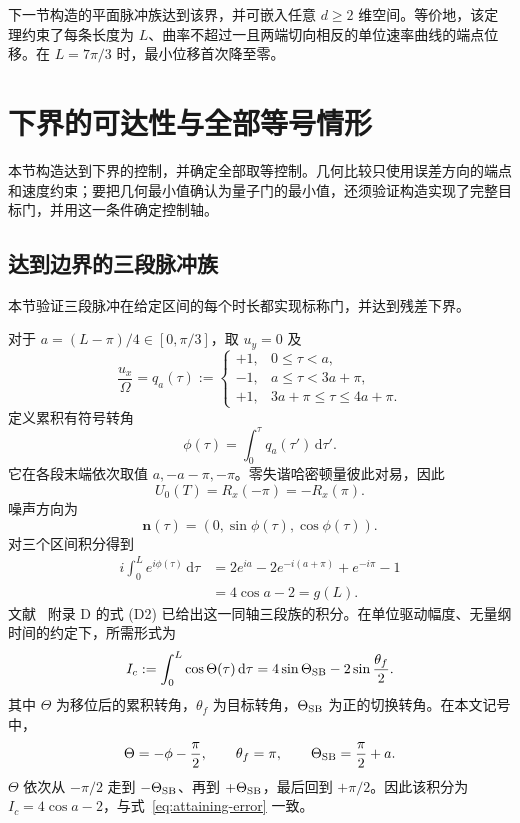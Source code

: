 \documentclass[12pt]{iopjournal}
\theoremstyle{definition}
\newcommand{\dd}{\mathrm{d}}
\newcommand{\nvec}{\mathbf n}
\begin{document}
下一节构造的平面脉冲族达到该界，并可嵌入任意 $d\ge2$ 维空间。等价地，该定理约束了每条长度为 $L$、曲率不超过一且两端切向相反的单位速率曲线的端点位移。在 $L=7\pi/3$ 时，最小位移首次降至零。

\section{下界的可达性与全部等号情形}
\label{sec:attainment}

本节构造达到下界的控制，并确定全部取等控制。几何比较只使用误差方向的端点和速度约束；要把几何最小值确认为量子门的最小值，还须验证构造实现了完整目标门，并用这一条件确定控制轴。

\FloatBarrier
\subsection{达到边界的三段脉冲族}

本节验证三段脉冲在给定区间的每个时长都实现标称门，并达到残差下界。

对于 $a=(L-\pi)/4\in[0,\pi/3]$，取 $u_y=0$ 及
\begin{equation}
 \frac{u_x}{\Omega}=q_a(\tau):=
 \begin{cases}
 +1,&0\le\tau<a,\\
 -1,&a\le\tau<3a+\pi,\\
 +1,&3a+\pi\le\tau\le4a+\pi.
 \end{cases}
 \label{eq:attaining-pulse}
\end{equation}
定义累积有符号转角
\begin{equation*}
 \phi(\tau)=\int_0^\tau q_a(\tau')\,\dd\tau'.
\end{equation*}
它在各段末端依次取值 $a,-a-\pi,-\pi$。零失谐哈密顿量彼此对易，因此
\begin{equation}
 U_0(T)=R_x(-\pi)=-R_x(\pi).
 \label{eq:attaining-gate}
\end{equation}
噪声方向为
\begin{equation}
 \nvec(\tau)=(0,\sin\phi(\tau),\cos\phi(\tau)).
 \label{eq:attaining-tangent}
\end{equation}
对三个区间积分得到
\begin{align}
 i\int_0^L e^{i\phi(\tau)}\,\dd\tau
 &=2e^{ia}-2e^{-i(a+\pi)}+e^{-i\pi}-1\nonumber\\
 &=4\cos a-2=g(L).
 \label{eq:attaining-error}
\end{align}
文献~\cite{kukita2024} 附录 D 的式 (D2) 已给出这一同轴三段族的积分。在单位驱动幅度、无量纲时间的约定下，所需形式为
\begin{equation*}
 I_c:=\int_0^L\cos\Theta(\tau)\,\dd\tau
 =4\sin\Theta_{\rm SB}-2\sin\frac{\theta_f}{2}.
\end{equation*}
其中 $\Theta$ 为移位后的累积转角，$\theta_f$ 为目标转角，$\Theta_{\rm SB}$ 为正的切换转角。在本文记号中，
\begin{equation*}
 \Theta=-\phi-\frac\pi2,\qquad
 \theta_f=\pi,\qquad \Theta_{\rm SB}=\frac\pi2+a.
\end{equation*}
$\Theta$ 依次从 $-\pi/2$ 走到 $-\Theta_{\rm SB}$、再到 $+\Theta_{\rm SB}$，最后回到 $+\pi/2$。因此该积分为 $I_c=4\cos a-2$，与式~\eqref{eq:attaining-error} 一致。
\end{document}
